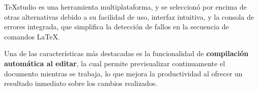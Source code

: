 	TeXstudio es una herramienta multiplataforma, y se seleccionó por encima de otras alternativas debido a su facilidad de uso, interfaz intuitiva, y la consola de errores integrada, que simplifica la detección de fallos en la secuencia de comandos LaTeX.
	
	Una de las características más destacadas es la funcionalidad de \textbf{compilación automática al editar}, la cual permite previsualizar continuamente el documento mientras se trabaja, lo que mejora la productividad al ofrecer un resultado inmediato sobre los cambios realizados.
	
	
	
	

